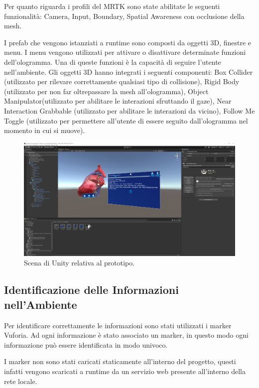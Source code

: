 Per quanto riguarda i profili del MRTK sono state abilitate le seguenti funzionalità: Camera, Input, Boundary, Spatial Awareness con occlusione della mesh.

I prefab che vengono istanziati a runtime sono composti da oggetti 3D, finestre e menu.
I menu vengono utilizzati per attivare o disattivare determinate funzioni dell'ologramma. Una di queste funzioni è la capacità di seguire l'utente nell'ambiente.
Gli oggetti 3D hanno integrati i seguenti componenti:
Box Collider (utilizzato per rilevare correttamente qualsiasi tipo di collisione), Rigid Body (utilizzato per non far oltrepassare la mesh all'ologramma), Object Manipulator(utilizzato per abilitare le interazioni sfruttando il gaze), Near Interaction Grabbable (utilizzato per abilitare le interazioni da vicino), Follow Me Toggle (utilizzato per permettere all'utente di essere seguito dall'ologramma nel momento in cui si muove).

\begin{figure}[H]
    \centering
    \includegraphics[width=\textwidth]{images/scena-unity-prototipo.png}
    \caption{Scena di Unity relativa al prototipo.}
    \label{fig:figure48}
\end{figure}

\subsection{Identificazione delle Informazioni nell'Ambiente}
Per identificare correttamente le informazioni sono stati utilizzati i marker Vuforia.
Ad ogni informazione è stato associato un marker, in questo modo ogni informazione può essere identificata in modo univoco.

I marker non sono stati caricati staticamente all'interno del progetto, questi infatti vengono scaricati a runtime da un servizio web presente all'interno della rete locale.

